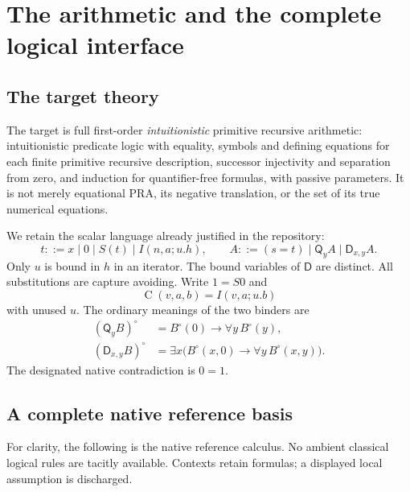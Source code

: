 \documentclass[11pt]{article}
\theoremstyle{definition}
\theoremstyle{remark}
\newcommand{\D}{\mathsf D}
\newcommand{\Q}{\mathsf Q}
\newcommand{\Sel}{\operatorname{C}}
\begin{document}
\section{The arithmetic and the complete logical interface}
\label{sec:calculus}

\subsection{The target theory}

The target is full first-order \emph{intuitionistic} primitive recursive
arithmetic: intuitionistic predicate logic with equality, symbols and
defining equations for each finite primitive recursive description,
successor injectivity and separation from zero, and induction for
quantifier-free formulas, with passive parameters.  It is not merely
equational PRA, its negative translation, or the set of its true numerical
equations.

We retain the scalar language already justified in the repository:
\[
 t ::= x\mid 0\mid S(t)\mid I(n,a;u.h),
 \qquad
 A ::= (s=t)\mid \Q_y A\mid\D_{x,y}A.
\]
Only $u$ is bound in $h$ in an iterator.  The bound variables of $\D$
are distinct.  All substitutions are capture avoiding.  Write $1=S0$ and
\[
 \Sel(v,a,b)=I(v,a;u.b)
\]
with unused $u$.  The ordinary meanings of the two binders are
\begin{align*}
 (\Q_y B)^\circ&=B^\circ(0)\to\forall y\,B^\circ(y),\\
 (\D_{x,y}B)^\circ&=\exists x\bigl(B^\circ(x,0)
                     \to\forall y\,B^\circ(x,y)\bigr).
\end{align*}
The designated native contradiction is $0=1$.

\subsection{A complete native reference basis}

For clarity, the following is the native reference calculus.  No ambient
classical logical rules are tacitly available.  Contexts retain formulas;
a displayed local assumption is discharged.
\end{document}
